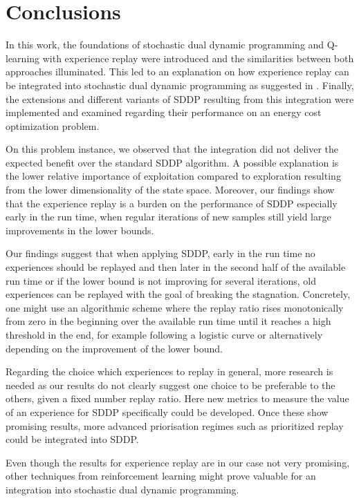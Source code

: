 \documentclass[a4paper,12pt]{article}
\begin{document}
\section{Conclusions}
In this work, the foundations of stochastic dual dynamic programming and Q-learning with experience replay were introduced and the similarities between both approaches illuminated. This led to an explanation on how experience replay can be integrated into stochastic dual dynamic programming as suggested in \cite{avila2023batch}.
Finally, the extensions and different variants of SDDP resulting from this integration were implemented and examined regarding their performance on an energy cost optimization problem.

On this problem instance, we observed that the integration did not deliver the expected benefit over the standard SDDP algorithm.
A possible explanation is the lower relative importance of exploitation compared to exploration resulting from the lower dimensionality of the state space.
Moreover, our findings show that the experience replay is a burden on the performance of SDDP especially early in the run time, when regular iterations of new samples still yield large improvements in the lower bounds.

Our findings suggest that when applying SDDP, early in the run time no experiences should be replayed and then later in the second half of the available run time or if the lower bound is not improving for several iterations, old experiences can be replayed with the goal of breaking the stagnation.
Concretely, one might use an algorithmic scheme where the replay ratio rises monotonically from zero in the beginning over the available run time until it reaches a high threshold in the end, for example following a logistic curve or alternatively depending on the improvement of the lower bound.

Regarding the choice which experiences to replay in general, more research is needed as our results do not clearly suggest one choice to be preferable to the others, given a fixed number replay ratio. Here new metrics to measure the value of an experience for SDDP specifically could be developed. Once these show promising results, more advanced priorisation regimes such as prioritized replay \cite{schaul2015prioritized} could be integrated into SDDP.

Even though the results for experience replay are in our case not very promising, other techniques from reinforcement learning might prove valuable for an integration into stochastic dual dynamic programming.


\printbibliography




\end{document}
